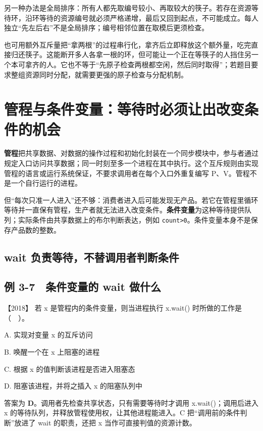 另一种办法是全局排序：所有人都先取编号较小、再取较大的筷子。若存在资源等待环，沿环等待的资源编号就必须严格递增，最后又回到起点，不可能成立。每人独立``先左后右''不是全局排序；编号相邻位置在取模后更须检查。

也可用额外互斥量把``拿两根''的过程串行化，拿齐后立即释放这个额外量，吃完直接归还筷子。这能断开多人各拿一根的环，但可能让一个正在等筷子的人挡住另一个本可拿齐的人。它也不等于``先原子检查两根都空闲，然后同时取得''；若题目要求整组资源同时分配，就需要更强的原子检查与分配机制。

\section{管程与条件变量：等待时必须让出改变条件的机会}\label{sec-monitor}

\textbf{管程}把共享数据、对数据的操作过程和初始化封装在一个同步模块中，参与者通过规定入口访问共享数据；同一时刻至多一个进程在其中执行。这个互斥规则由实现管程的语言或运行系统保证，不要求调用者在每个入口外重复编写 P、V。管程不是一个自行运行的进程。

但``每次只准一人进入''还不够：消费者进入后可能发现无产品。若它在管程里循环等待并一直保有管程，生产者就无法进入改变条件。\textbf{条件变量}为这种等待提供队列；实际条件由共享数据上的布尔判断表达，例如 \texttt{count\textgreater{}0}。条件变量本身不是保存产品数的整数。

\subsection{wait 负责等待，不替调用者判断条件}\label{os-c03-h483}

\subsection{例 3-7　条件变量的 wait 做什么}\label{ex-2018}

\noindent{}【2018】 若 x 是管程内的条件变量，则当进程执行 x.wait() 时所做的工作是（　）。

A. 实现对变量 x 的互斥访问

B. 唤醒一个在 x 上阻塞的进程

C. 根据 x 的值判断该进程是否进入阻塞态

D. 阻塞该进程，并将之插入 x 的阻塞队列中

答案为 \textbf{D}。调用者先检查共享状态，只有需要等待时才调用 x.wait()；调用后进入 x 的等待队列，并释放管程使用权，让其他进程能进入。C 把``调用前的条件判断''放进了 wait 的职责，还把 x 当作可直接判值的资源计数。

